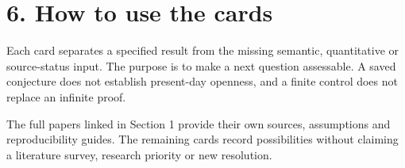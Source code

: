 \documentclass[
  11pt,
  letterpaper,
]{article}
\begin{document}
\section{6. How to use the cards}\label{how-to-use-the-cards}

Each card separates a specified result from the missing semantic,
quantitative or source-status input. The purpose is to make a next
question assessable. A saved conjecture does not establish present-day
openness, and a finite control does not replace an infinite proof.

The full papers linked in Section 1 provide their own sources,
assumptions and reproducibility guides. The remaining cards record
possibilities without claiming a literature survey, research priority or
new resolution.
\end{document}
